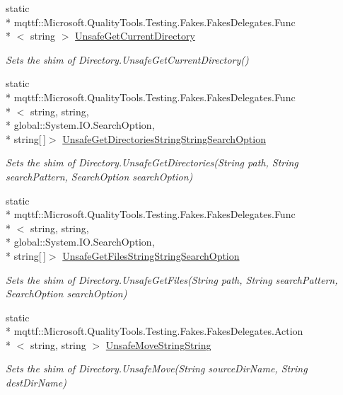 \begin{DoxyCompactItemize}
static \\*
mqttf\-::\-Microsoft.\-Quality\-Tools.\-Testing.\-Fakes.\-Fakes\-Delegates.\-Func\\*
$<$ string $>$ \hyperlink{class_system_1_1_i_o_1_1_fakes_1_1_shim_directory_a65b5aff758d109f748ee2839608bed01}{Unsafe\-Get\-Current\-Directory}
\begin{DoxyCompactList}\small\item\em Sets the shim of Directory.\-Unsafe\-Get\-Current\-Directory()\end{DoxyCompactList}\item 
static \\*
mqttf\-::\-Microsoft.\-Quality\-Tools.\-Testing.\-Fakes.\-Fakes\-Delegates.\-Func\\*
$<$ string, string, \\*
global\-::\-System.\-I\-O.\-Search\-Option, \\*
string\mbox{[}$\,$\mbox{]}$>$ \hyperlink{class_system_1_1_i_o_1_1_fakes_1_1_shim_directory_a0d8127ac0e57913979162611cc01fdb1}{Unsafe\-Get\-Directories\-String\-String\-Search\-Option}
\begin{DoxyCompactList}\small\item\em Sets the shim of Directory.\-Unsafe\-Get\-Directories(\-String path, String search\-Pattern, Search\-Option search\-Option)\end{DoxyCompactList}\item 
static \\*
mqttf\-::\-Microsoft.\-Quality\-Tools.\-Testing.\-Fakes.\-Fakes\-Delegates.\-Func\\*
$<$ string, string, \\*
global\-::\-System.\-I\-O.\-Search\-Option, \\*
string\mbox{[}$\,$\mbox{]}$>$ \hyperlink{class_system_1_1_i_o_1_1_fakes_1_1_shim_directory_ac72f99116d232a6220778e34376886ce}{Unsafe\-Get\-Files\-String\-String\-Search\-Option}
\begin{DoxyCompactList}\small\item\em Sets the shim of Directory.\-Unsafe\-Get\-Files(\-String path, String search\-Pattern, Search\-Option search\-Option)\end{DoxyCompactList}\item 
static \\*
mqttf\-::\-Microsoft.\-Quality\-Tools.\-Testing.\-Fakes.\-Fakes\-Delegates.\-Action\\*
$<$ string, string $>$ \hyperlink{class_system_1_1_i_o_1_1_fakes_1_1_shim_directory_a154cddad58b9ff7ee385a75a1ac71bbf}{Unsafe\-Move\-String\-String}
\begin{DoxyCompactList}\small\item\em Sets the shim of Directory.\-Unsafe\-Move(\-String source\-Dir\-Name, String dest\-Dir\-Name)\end{DoxyCompactList}\end{DoxyCompactItemize}


